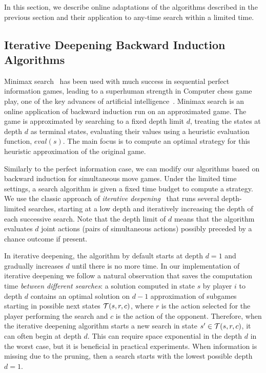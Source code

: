 
In this section, we describe online adaptations of the algorithms described in the previous section and their application
to any-time search within a limited time.

\subsection{Iterative Deepening Backward Induction Algorithms} \label{sec:idbi}

Minimax search~\cite{AIbook} has been used with much success in sequential perfect information games,
leading to a superhuman strength in Computer chess game play, one of the key advances of artificial
intelligence~\cite{Campbell02deepblue}.
Minimax search is an online application of backward induction run on an approximated game.
The game is approximated by searching to a fixed depth limit $d$, treating the states at depth $d$
as terminal states, evaluating their values using a heuristic evaluation function, $eval(s)$.
The main focus is to compute an optimal strategy for this heuristic approximation of the original game.

Similarly to the perfect information case, we can modify our algorithms based on backward induction for simultaneous move games.
Under the limited time settings, a search algorithm is given a fixed time budget to compute a strategy.
We use the classic approach of {\it iterative deepening}~\cite{AIbook} that runs several depth-limited
searches, starting at a low depth and iteratively increasing the depth of each successive search.
Note that the depth limit of $d$ means that the algorithm evaluates $d$ joint actions (\ie pairs of simultaneous actions) possibly preceded by a chance outcome if present.

In iterative deepening, the algorithm by default starts at depth $d = 1$ and gradually increases $d$ until there is no more time.
In our implementation of iterative deepening we follow a natural observation that saves the computation time {\it between different searches}: 
a solution computed in state $s$ by player $i$ to depth $d$ contains an optimal solution on $d-1$ approximation of subgames starting in possible next states $\mathcal{T}(s,r,c)$, where $r$ is the action selected for the player performing the search and $c$ is the action of the opponent.
Therefore, when the iterative deepening algorithm starts a new search in state $s' \in \mathcal{T}(s,r,c)$, it can often begin at depth $d$.
This can require space exponential in the depth $d$ in the worst case, but it is beneficial in practical experiments.
When information is missing due to the pruning, then a search starts with the lowest possible depth $d = 1$.

